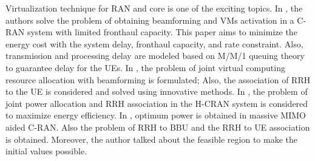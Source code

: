 \documentclass[conference]{IEEEtran}
\begin{document}
Virtualization technique for RAN and core is one of the exciting topics.  
In \cite{SystemCostMinimization,guo2016exploiting}, the authors solve the problem of obtaining beamforming and VMs activation in a C-RAN system with limited fronthaul capacity. 
This paper aims to minimize the energy cost with the system delay, fronthaul capacity, and rate constraint. 
Also, transmission and processing delay are modeled based on M/M/1 queuing theory to guarantee delay for the UEs.
 In \cite{luong2018joint,luong2018novel}, the problem of joint virtual computing resource allocation with beamforming is formulated; Also, the association of RRH to the UE is considered and solved using innovative methods.
In \cite{ali2019energy,ali2019energy1,ali2018joint}, the problem of joint power allocation and RRH association in the H-CRAN system is considered to maximize energy efficiency.
In \cite{amani2019power}, optimum power is obtained in massive MIMO aided C-RAN. Also the problem of RRH to BBU and the RRH to UE association is obtained. Moreover, the author talked about the feasible region to make the initial values possible.
\end{document}
